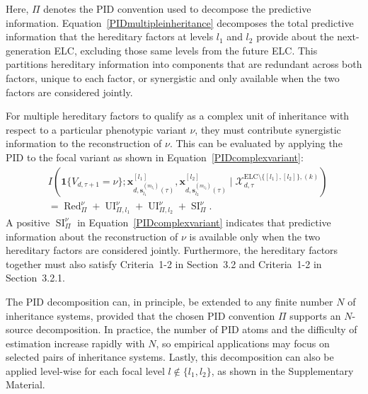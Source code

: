 \documentclass[pdflatex,sn-mathphys-num]{sn-jnl}
\theoremstyle{thmstylethree}
\theoremstyle{thmstyleone}
\begin{document}
Here, $\Pi$ denotes the PID convention used to decompose the predictive information. Equation~\ref{PIDmultipleinheritance} decomposes the total predictive information that the hereditary factors at levels $l_1$ and $l_2$ provide about the next-generation ELC, excluding those same levels from the future ELC. This partitions hereditary information into components that are redundant across both factors, unique to each factor, or synergistic and only available when the two factors are considered jointly.

For multiple hereditary factors to qualify as a complex unit of inheritance with respect to a particular phenotypic variant $\nu$, they must contribute synergistic information to the reconstruction of $\nu$. This can be evaluated by applying the PID to the focal variant as shown in Equation~\ref{PIDcomplexvariant}:
\begin{align}
\label{PIDcomplexvariant}
&
I\left(
\mathbf{1}\{V_{d,\tau+1}=\nu\};
\mathbf{x}^{[l_1]}_{d,\mathbf{s}^{(m_{l_1})}_{l_1}(\tau)},
\mathbf{x}^{[l_2]}_{d,\mathbf{s}^{(m_{l_2})}_{l_2}(\tau)}
\mid
\mathcal{X}^{\mathrm{ELC}\setminus\{[l_1],[l_2]\},(k)}_{d,\tau}
\right)
\nonumber\\
&=
\operatorname{Red}^{\nu}_{\Pi}
+
\operatorname{UI}^{\nu}_{\Pi,l_1}
+
\operatorname{UI}^{\nu}_{\Pi,l_2}
+
\operatorname{SI}^{\nu}_{\Pi}.
\end{align}
A positive $\operatorname{SI}^{\nu}_{\Pi}$ in Equation~\ref{PIDcomplexvariant} indicates that predictive information about the reconstruction of $\nu$ is available only when the two hereditary factors are considered jointly. Furthermore, the hereditary factors together must also satisfy Criteria~1-2 in Section~3.2 and Criteria~1-2 in Section~3.2.1. %

The PID decomposition can, in principle, be extended to any finite number $N$ of inheritance systems, provided that the chosen PID convention $\Pi$ supports an $N$-source decomposition. In practice, the number of PID atoms and the difficulty of estimation increase rapidly with $N$, so empirical applications may focus on selected pairs of inheritance systems. Lastly, this decomposition can also be applied level-wise for each focal level $l\notin\{l_1,l_2\}$, as shown in the Supplementary Material.
\end{document}
